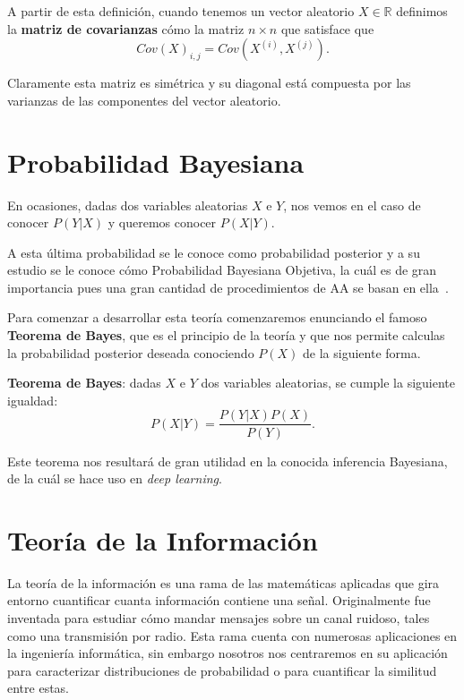 \begin{itemize}
    A partir de esta definición, cuando tenemos un vector aleatorio $X \in \mathbb{R}$ definimos la \textbf{matriz de covarianzas} cómo la matriz $n \times n$ que satisface que
    \begin{equation}
        Cov(X)_{i, j} = Cov(X^{(i)}, X^{(j)}).
    \end{equation}

    Claramente esta matriz es simétrica y su diagonal está compuesta por las varianzas de las componentes del vector aleatorio.
\end{itemize}

\section{Probabilidad Bayesiana}
En ocasiones, dadas dos variables aleatorias $X$ e $Y$, nos vemos en el caso de conocer $P(Y | X)$ y queremos conocer $P(X | Y)$.

A esta última probabilidad se le conoce como probabilidad posterior y a su estudio se le conoce cómo Probabilidad Bayesiana Objetiva, la cuál es de gran importancia pues una gran cantidad de procedimientos de \ac{AA} se basan en ella~\cite{gelman-2004}.

Para comenzar a desarrollar esta teoría comenzaremos enunciando el famoso \textbf{Teorema de Bayes}, que es el principio de la teoría y que nos permite calculas la probabilidad posterior deseada conociendo $P(X)$ de la siguiente forma.
\begin{theorem}
    \textbf{Teorema de Bayes}: dadas $X$ e $Y$ dos variables aleatorias, se cumple la siguiente igualdad:
    \begin{equation}
        P(X | Y) = \frac{P(Y | X)P(X)}{P(Y)}.
    \end{equation}
\end{theorem}

Este teorema nos resultará de gran utilidad en la conocida inferencia Bayesiana, de la cuál se hace uso en \textit{deep learning}.

\section{Teoría de la Información}
La teoría de la información es una rama de las matemáticas aplicadas que gira entorno cuantificar cuanta información contiene una señal. Originalmente fue inventada para estudiar cómo mandar mensajes sobre un canal ruidoso, tales como una transmisión por radio. Esta rama cuenta con numerosas aplicaciones en la ingeniería informática, sin embargo nosotros nos centraremos en su aplicación para caracterizar distribuciones de probabilidad o para cuantificar la similitud entre estas.

